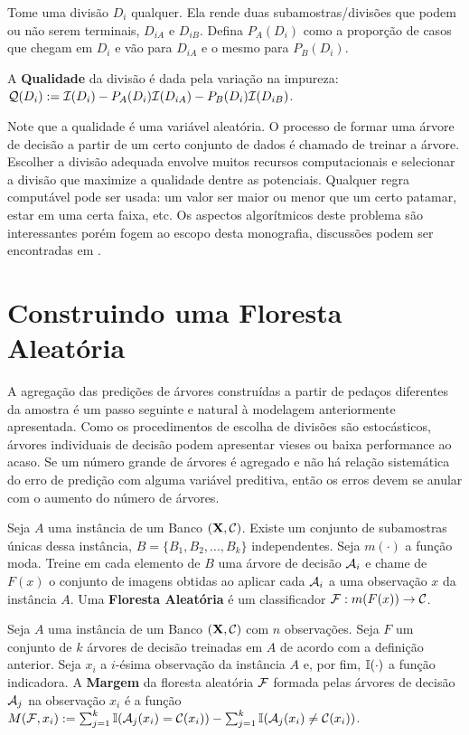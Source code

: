 Tome uma divisão $D_i$ qualquer. Ela rende duas subamostras/divisões que podem ou não serem terminais, $D_{iA}$ e $D_{iB}$. Defina $P_A (D_i)$ como a proporção de casos que chegam em $D_i$ e vão para $D_{iA}$ e o mesmo para $P_B (D_i)$.

\begin{defi}
A \textbf{Qualidade} da divisão é dada pela variação na impureza: $\mathcal{Q} (D_i) := \mathcal{I}(D_i) - P_A(D_i) \mathcal{I} (D_{iA}) - P_B(D_i) \mathcal{I} (D_{iB})$.
\end{defi}

Note que a qualidade é uma variável aleatória. O processo de formar uma árvore de decisão a partir de um certo conjunto de dados é chamado de treinar a árvore. Escolher a divisão adequada envolve muitos recursos computacionais e selecionar a divisão que maximize a qualidade dentre as potenciais. Qualquer regra computável pode ser usada: um valor ser maior ou menor que um certo patamar, estar em uma certa faixa, etc. Os aspectos algorítmicos deste problema são interessantes porém fogem ao escopo desta monografia, discussões podem ser encontradas em .
 
 \section{Construindo uma Floresta Aleatória}
 
 A agregação das predições de árvores construídas a partir de pedaços diferentes da amostra é um passo seguinte e natural à modelagem anteriormente apresentada. Como os procedimentos de escolha de divisões são estocásticos, árvores individuais de decisão podem apresentar vieses ou baixa performance ao acaso. Se um número grande de árvores é agregado e não há relação sistemática do erro de predição com alguma variável preditiva, então os erros devem se anular com o aumento do número de árvores.
 
 \begin{defi}
 Seja $A$ uma instância de um Banco $(\mathbf{X}, \mathcal{C})$. Existe um conjunto de subamostras únicas dessa instância, $B = \{ B_1, B_2, ..., B_k\}$  independentes. Seja $m(\cdot)$ a função moda. Treine em cada elemento de $B$ uma árvore de decisão $\mathcal{A}_i$ e chame de $F(x)$ o conjunto de imagens obtidas ao aplicar cada $\mathcal{A}_i$ a uma observação $x$ da instância $A$. Uma \textbf{Floresta Aleatória} é um classificador $\mathcal{F} : m(F(x)) \to \mathcal{C}$. 
  \end{defi}
  
  \begin{defi}
  Seja $A$ uma instância de um Banco $(\mathbf{X}, \mathcal{C})$ com $n$ observações. Seja $F$ um conjunto de $k$ árvores de decisão treinadas em $A$ de acordo com a definição anterior. Seja $x_i$ a $i$-ésima observação da instância $A$ e, por fim, $\mathbb{I}(\cdot)$ a função indicadora. A \textbf{Margem} da floresta aleatória $\mathcal{F}$ formada pelas árvores de decisão $\mathcal{A}_j$ na observação $x_i$ é a função $M(\mathcal{F}, x_i) := \sum_{j=1}^k \mathbb{I} ( \mathcal{A}_j (x_i) = \mathcal{C}(x_i) ) - \sum_{j=1}^k \mathbb{I}  ( \mathcal{A}_j (x_i) \neq \mathcal{C}(x_i) )$.
  
  \end{defi}
  
